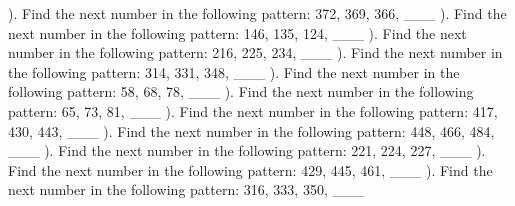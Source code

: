 \documentclass{article}%
\begin{document}
\newline%
\newline%
). Find the next number in the following pattern: 372, 369, 366, \_\_\_%
\newline%
\newline%
). Find the next number in the following pattern: 146, 135, 124, \_\_\_%
\newline%
\newline%
). Find the next number in the following pattern: 216, 225, 234, \_\_\_%
\newline%
\newline%
). Find the next number in the following pattern: 314, 331, 348, \_\_\_%
\newline%
\newline%
). Find the next number in the following pattern: 58, 68, 78, \_\_\_%
\newline%
\newline%
). Find the next number in the following pattern: 65, 73, 81, \_\_\_%
\newline%
\newline%
). Find the next number in the following pattern: 417, 430, 443, \_\_\_%
\newline%
\newline%
). Find the next number in the following pattern: 448, 466, 484, \_\_\_%
\newline%
\newline%
). Find the next number in the following pattern: 221, 224, 227, \_\_\_%
\newline%
\newline%
). Find the next number in the following pattern: 429, 445, 461, \_\_\_%
\newline%
\newline%
). Find the next number in the following pattern: 316, 333, 350, \_\_\_%
\newline%
\newline%
\newline%
\end{document}
